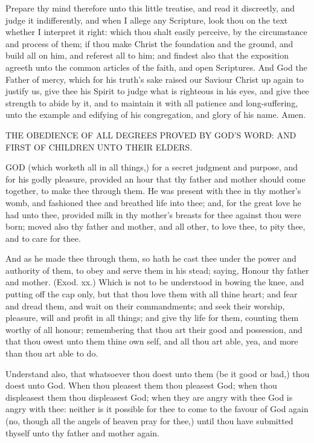 Prepare thy mind therefore unto this little treatise, and 
read it discreetly, and judge it indifferently, and when I
allege any Scripture, look thou on the text whether I interpret
it right: which thou shalt easily perceive, by the circumstance
and process of them; if thou make Christ the 
foundation and the ground, and build all on him, and referest
all to him; and findest also that the exposition 
agreeth unto the common articles of the faith, and open 
Scriptures. And God the Father of mercy, which for his 
truth's sake raised our Saviour Christ up again to justify 
us, give thee his Spirit to judge what is righteous in his 
eyes, and give thee strength to abide by it, and to maintain
it with all patience and long-suffering, unto the 
example and edifying of his congregation, and glory of his 
name. Amen. 


THE 
OBEDIENCE OF ALL DEGREES 
PROVED BY GOD'S WORD: AND FIRST OF CHILDREN 
UNTO THEIR ELDERS.

GOD (which worketh all in all things,) for a secret 
judgment and purpose, and for his godly pleasure, 
provided an hour that thy father and mother should come 
together, to make thee through them. He was present 
with thee in thy mother's womb, and fashioned thee 
and breathed life into thee; and, for the great love he had 
unto thee, provided milk in thy mother's breasts for thee 
against thou were born; moved also thy father and 
mother, and all other, to love thee, to pity thee, and to 
care for thee. 

And as he made thee through them, so hath he cast thee 
under the power and authority of them, to obey and serve 
them in his stead; saying, Honour thy father and mother. 
(Exod. xx.) Which is not to be understood in bowing 
the knee, and putting off the cap only, but that thou love 
them with all thine heart; and fear and dread them, and 
wait on their commandments; and seek their worship,
pleasure, will and profit in all things; and give thy life for 
them, counting them worthy of all honour; remembering 
that thou art their good and possession, and that thou 
owest unto them thine own self, and all thou art able, yea, 
and more than thou art able to do.

Understand also, that whatsoever thou doest unto them 
(be it good or bad,) thou doest unto God. When thou 
pleasest them thou pleasest God; when thou displeasest 
them thou displeasest God; when they are angry with 
thee God is angry with thee: neither is it possible for 
thee to come to the favour of God again (no, though 
all the angels of heaven pray for thee,) until thou have 
submitted thyself unto thy father and mother again. 


